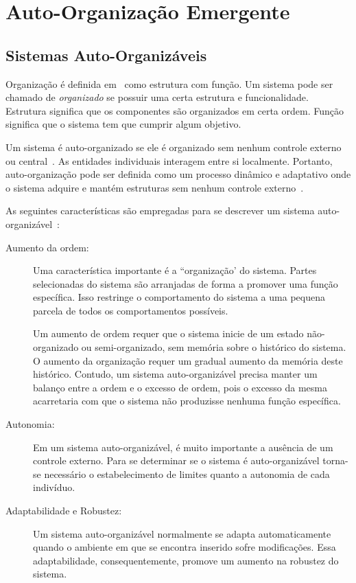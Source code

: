 \section{Auto-Organização Emergente}

\subsection{Sistemas Auto-Organizáveis}

Organização é definida em~\cite{Heylighen2003} como estrutura com função. Um sistema pode ser chamado de \emph{organizado} se possuir uma certa estrutura e funcionalidade. Estrutura significa que os componentes são organizados em certa ordem. Função significa que o sistema tem que cumprir algum objetivo.

Um sistema é auto-organizado se ele é organizado sem nenhum controle externo ou central~\cite{Heylighen2003}. As entidades individuais interagem entre si localmente. Portanto,  auto-organização pode ser definida como um processo dinâmico e adaptativo onde o sistema adquire e mantém estruturas sem nenhum controle externo~\cite{DeWolf2005a}.

As seguintes características são empregadas para se descrever um sistema auto-organizável~\cite{DeWolf2005a}:
\begin{description}
 \item [Aumento da ordem:] Uma característica importante é a ``organização' do sistema. Partes selecionadas do sistema são arranjadas de forma a promover uma função específica. Isso restringe o comportamento do sistema a uma pequena parcela de todos os comportamentos possíveis.

Um aumento de ordem requer que o sistema inicie de um estado não-organizado ou semi-organizado, sem memória sobre o histórico do sistema. O aumento da organização requer um gradual aumento da memória deste histórico. Contudo, um sistema auto-organizável precisa manter um balanço entre a ordem e o excesso de ordem, pois o excesso da mesma acarretaria com que o sistema não produzisse nenhuma função específica.

\item[Autonomia:] Em um sistema auto-organizável, é muito importante a ausência de um controle externo. Para se determinar se o sistema é auto-organizável torna-se necessário o estabelecimento de limites quanto a autonomia de cada indivíduo.

\item[Adaptabilidade e Robustez:] Um sistema auto-organizável normalmente se adapta automaticamente quando o ambiente em que se encontra inserido sofre modificações. Essa adaptabilidade, consequentemente, promove um aumento na robustez do sistema.


\end{description}


